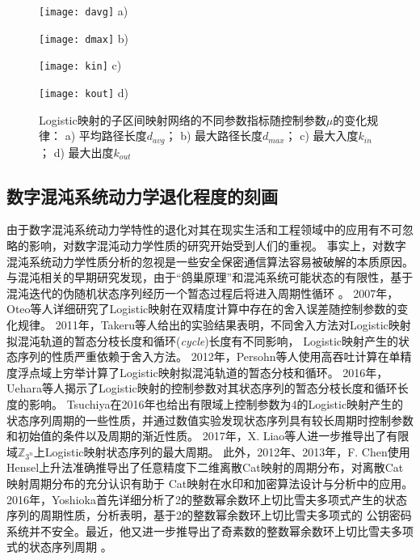 \begin{figure}[!htb]
\centering
\begin{minipage}{\TwoImW}
\centering
\texttt{[image: davg]}
a)
\end{minipage}\hspace{1mm}
\begin{minipage}{\TwoImW}
\centering
\texttt{[image: dmax]}
b)
\end{minipage}
\begin{minipage}{\TwoImW}
\centering
\texttt{[image: kin]}
c)
\end{minipage}\hspace{1mm}
\begin{minipage}{\TwoImW}
\centering
\texttt{[image: kout]}
d)
\end{minipage}
\caption{Logistic映射的子区间映射网络的不同参数指标随控制参数$\mu$的变化规律： a) 平均路径长度$d_{avg}$； b) 最大路径长度$d_{max}$；
c) 最大入度$k_{in}$； d) 最大出度$k_{out}$}
\label{fig:davg_dmax_kin_kout}
\end{figure}

\subsection{数字混沌系统动力学退化程度的刻画}

由于数字混沌系统动力学特性的退化对其在现实生活和工程领域中的应用有不可忽略的影响，对数字混沌动力学性质的研究开始受到人们的重视。
事实上，对数字混沌系统动力学性质分析的忽视是一些安全保密通信算法容易被破解的本质原因。
与混沌相关的早期研究发现，由于“鸽巢原理”和混沌系统可能状态的有限性，基于混沌迭代的伪随机状态序列经历一个暂态过程后将进入周期性循环
。
2007年，Oteo等人详细研究了Logistic映射在双精度计算中存在的舍入误差随控制参数的变化规律。
2011年，Takeru等人给出的实验结果表明，不同舍入方法对Logistic映射拟混沌轨道的暂态分枝长度和循环(\emph{cycle})长度有不同影响，
Logistic映射产生的状态序列的性质严重依赖于舍入方法。
2012年，Persohn等人使用高吞吐计算在单精度浮点域上穷举计算了Logistic映射拟混沌轨道的暂态分枝和循环。
2016年，Uehara等人揭示了Logistic映射的控制参数对其状态序列的暂态分枝长度和循环长度的影响。
Tsuchiya在2016年也给出有限域上控制参数为4的Logistic映射产生的状态序列周期的一些性质，并通过数值实验发现状态序列具有较长周期时控制参数
和初始值的条件以及周期的渐近性质。
2017年，X. Liao等人进一步推导出了有限域$\mathbb{Z}_{3^n}$上Logistic映射状态序列的最大周期。
此外，2012年、2013年，F. Chen使用Hensel上升法准确推导出了任意精度下二维离散Cat映射的周期分布，对离散Cat映射周期分布的充分认识有助于
Cat映射在水印和加密算法设计与分析中的应用。
2016年，Yoshioka首先详细分析了2的整数幂余数环上切比雪夫多项式产生的状态序列的周期性质，分析表明，基于2的整数幂余数环上切比雪夫多项式的
公钥密码系统并不安全。最近，他又进一步推导出了奇素数的整数幂余数环上切比雪夫多项式的状态序列周期
。

